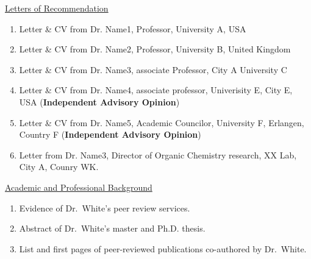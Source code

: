 \documentclass{article}
\newcommand{\lname}{White}
\newcommand{\drfn}{Dr.~\lname}
\newcommand{\oc}{Organic Chemistry}
\begin{document}
\underline{Letters of Recommendation}
\begin{enumerate}[resume]
    \item Letter \& CV from Dr. Name1, Professor, University A, USA\label{exh:letter-a}
    \item Letter \& CV from Dr. Name2, Professor, University B, United Kingdom\label{exh:letter-b}
    \item Letter \& CV from Dr. Name3, associate Professor, City A University C\label{exh:letter-c}
    \item Letter \& CV from Dr. Name4, associate professor, Univerisity E, City E, USA (\textbf{Independent Advisory Opinion}) \label{exh:letter-d}
    \item Letter \& CV from Dr. Name5, Academic Councilor, University F, Erlangen, Country F (\textbf{Independent Advisory Opinion}) \label{exh:letter-e}
    \item Letter from Dr. Name3, Director of \oc{} research, XX Lab, City A, Counry WK.\label{exh:letter-f}
\end{enumerate}

\underline{Academic and Professional Background}
\begin{enumerate}[resume]
    \item Evidence of \drfn's peer review services.\label{exh:peer-review}
    \item Abstract of \drfn's master and Ph.D. thesis.\label{exh:thesis}
    \item List and first pages of peer-reviewed publications co-authored by \drfn.\label{exh:publications}
\end{enumerate}
\end{document}
